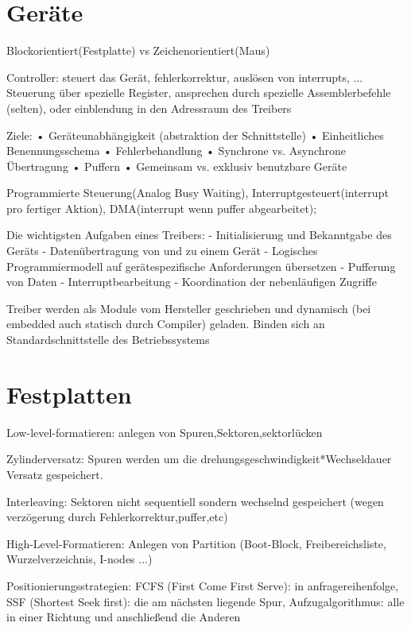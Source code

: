 \section*{Geräte}
Blockorientiert(Festplatte) vs Zeichenorientiert(Maus)

Controller: steuert das Gerät, fehlerkorrektur, auslösen von interrupts, ...
Steuerung über spezielle Register, ansprechen durch spezielle Assemblerbefehle (selten), oder einblendung in den Adressraum des Treibers

Ziele:
• Geräteunabhängigkeit (abstraktion der Schnittstelle)
• Einheitliches Benennungsschema
• Fehlerbehandlung
• Synchrone vs. Asynchrone Übertragung
• Puffern
• Gemeinsam vs. exklusiv benutzbare Geräte

Programmierte Steuerung(Analog Busy Waiting), Interruptgesteuert(interrupt pro fertiger Aktion), DMA(interrupt wenn puffer abgearbeitet);

Die wichtigsten Aufgaben eines Treibers:
- Initialisierung und Bekanntgabe des Geräts
- Datenübertragung von und zu einem Gerät
- Logisches Programmiermodell auf gerätespezifische
Anforderungen übersetzen
- Pufferung von Daten
- Interruptbearbeitung
- Koordination der nebenläufigen Zugriffe

Treiber werden als Module vom Hersteller geschrieben und dynamisch (bei embedded auch statisch durch Compiler) geladen. Binden sich an Standardschnittstelle des Betriebssystems

\section*{Festplatten}
Low-level-formatieren: anlegen von Spuren,Sektoren,sektorlücken

Zylinderversatz: Spuren werden um die drehungsgeschwindigkeit*Wechseldauer Versatz gespeichert.

Interleaving: Sektoren nicht sequentiell sondern wechselnd gespeichert (wegen verzögerung durch Fehlerkorrektur,puffer,etc)

High-Level-Formatieren:
Anlegen von Partition (Boot-Block, Freibereichsliste, Wurzelverzeichnis, I-nodes ...)

Positionierungsstrategien: FCFS (First Come First Serve): in anfragereihenfolge,
SSF (Shortest Seek first): die am nächsten liegende Spur, Aufzugalgorithmus: alle in einer Richtung und anschließend die Anderen